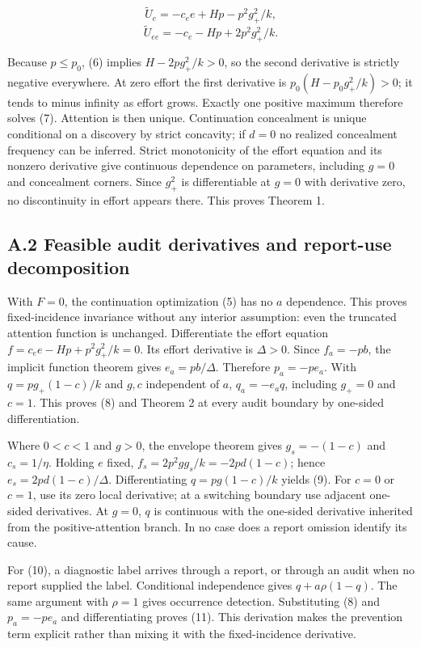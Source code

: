\documentclass[
  11pt,
]{article}
\begin{document}
\[\widetilde U_e=-c_e e+Hp-p^2g_+^2/k,\]
\[\widetilde U_{ee}=-c_e-Hp+2p^2g_+^2/k.\]

Because \(p\leq p_0\), (6) implies \(H-2pg_+^2/k>0\), so the second
derivative is strictly negative everywhere. At zero effort the first
derivative is \(p_0(H-p_0g_+^2/k)>0\); it tends to minus infinity as
effort grows. Exactly one positive maximum therefore solves (7).
Attention is then unique. Continuation concealment is unique conditional
on a discovery by strict concavity; if \(d=0\) no realized concealment
frequency can be inferred. Strict monotonicity of the effort equation
and its nonzero derivative give continuous dependence on parameters,
including \(g=0\) and concealment corners. Since \(g_+^2\) is
differentiable at \(g=0\) with derivative zero, no discontinuity in
effort appears there. This proves Theorem 1.

\subsection{A.2 Feasible audit derivatives and report-use
decomposition}\label{a.2-feasible-audit-derivatives-and-report-use-decomposition}

With \(F=0\), the continuation optimization (5) has no \(a\) dependence.
This proves fixed-incidence invariance without any interior assumption:
even the truncated attention function is unchanged. Differentiate the
effort equation \(f=c_e e-Hp+p^2g_+^2/k=0\). Its effort derivative is
\(\Delta>0\). Since \(f_a=-pb\), the implicit function theorem gives
\(e_a=pb/\Delta\). Therefore \(p_a=-pe_a\). With \(q=p g_+(1-c)/k\) and
\(g,c\) independent of \(a\), \(q_a=-e_aq\), including \(g_+=0\) and
\(c=1\). This proves (8) and Theorem 2 at every audit boundary by
one-sided differentiation.

Where \(0<c<1\) and \(g>0\), the envelope theorem gives \(g_s=-(1-c)\)
and \(c_s=1/\eta\). Holding \(e\) fixed, \(f_s=2p^2g g_s/k=-2pd(1-c)\);
hence \(e_s=2pd(1-c)/\Delta\). Differentiating \(q=p g(1-c)/k\) yields
(9). For \(c=0\) or \(c=1\), use its zero local derivative; at a
switching boundary use adjacent one-sided derivatives. At \(g=0\), \(q\)
is continuous with the one-sided derivative inherited from the
positive-attention branch. In no case does a report omission identify
its cause.

For (10), a diagnostic label arrives through a report, or through an
audit when no report supplied the label. Conditional independence gives
\(q+a\rho(1-q)\). The same argument with \(\rho=1\) gives occurrence
detection. Substituting (8) and \(p_a=-pe_a\) and differentiating proves
(11). This derivation makes the prevention term explicit rather than
mixing it with the fixed-incidence derivative.
\end{document}
